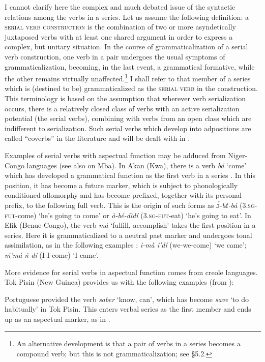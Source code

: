 \label{page37}I cannot clarify here the complex and much debated issue of the syntactic relations among the verbs in a series. Let us assume the following definition: a \textsc{serial verb construction} is the combination of two or more asyndetically juxtaposed verbs with at least one shared argument in order to express a complex, but unitary situation. In the course of grammaticalization of a serial verb construction, one verb in a pair undergoes the usual symptoms of grammaticalization, becoming, in the last event, a grammatical formative, while the other remains virtually unaffected.\footnote{An alternative development is that a pair of verbs in a series becomes a compound verb; but this is not grammaticalization; see §5.2.} I shall refer to that member of a series which is (destined to be) grammaticalized as the \textsc{serial verb} in the construction. This terminology is based on the assumption that wherever verb serialization occurs, there is a relatively closed class of verbs with an active serialization potential (the serial verbs), combining with verbs from an open class which are indifferent to serialization. Such serial verbs which develop into adpositions are called ``coverbs'' in the literature and will be dealt with in .

Examples of serial verbs with aspectual function may be adduced from Niger-Congo languages (see also \citealt[113--117]{Sasse1977a} on Mba). In Akan (Kwa), there is a verb \textit{bá} ‘come’ which has developed a grammatical function as the first verb in a series \citep[353f]{Welmers1973}. In this position, it has become a future marker, which is subject to phonologically conditioned allomorphy and has become prefixed, together with its personal prefix, to the following full verb. This is the origin of such forms as \textit{\'ɔ-bέ-bá} (3.\textsc{sg-fut}-come) ‘he's going to come’ or \textit{ò-bé-dìdí} (3.\textsc{sg-fut}-eat) ‘he's going to eat’. In Efik (Benue-Congo), the verb \textit{mà} ‘fulfill, accomplish’ takes the first position in a series. Here it is grammaticalized to a neutral past marker and undergoes tonal assimilation, as in the following examples \citep[371]{Welmers1973}: \textit{ì-mà í'dí} (we-\past we-come) ‘we came’; \textit{\'m'má ń-dí} (I-\past I-come) ‘I came’.

More evidence for serial verbs in aspectual function comes from creole languages. Tok Pisin (New Guinea) provides us with the following examples (from \citealt{Mosel1980}):

\noindent Portuguese provided the verb \textit{saber} ‘know, can’, which has become \textit{save} ‘to do habitually’ in Tok Pisin. This enters verbal series as the first member and ends up as an aspectual marker, as in .

